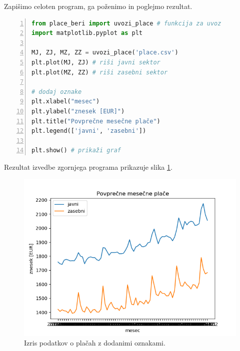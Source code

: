 Zapišimo celoten program, ga poženimo in poglejmo rezultat. 
\begin{lstlisting}[language=Python, showstringspaces=false,numbers=left]
from place_beri import uvozi_place # funkcija za uvoz
import matplotlib.pyplot as plt

MJ, ZJ, MZ, ZZ = uvozi_place('place.csv')
plt.plot(MJ, ZJ) # riši javni sektor
plt.plot(MZ, ZZ) # riši zasebni sektor

# dodaj oznake
plt.xlabel("mesec")
plt.ylabel("znesek [EUR]")
plt.title("Povprečne mesečne plače")
plt.legend(['javni', 'zasebni'])

plt.show() # prikaži graf
\end{lstlisting}
Rezultat izvedbe zgornjega programa prikazuje slika \ref{img:plt4}.
\begin{figure}
    \includegraphics[width=\linewidth]{img/plt4.png}
    \caption{Izris podatkov o plačah z dodanimi oznakami.}
    \label{img:plt4}
\end{figure}

